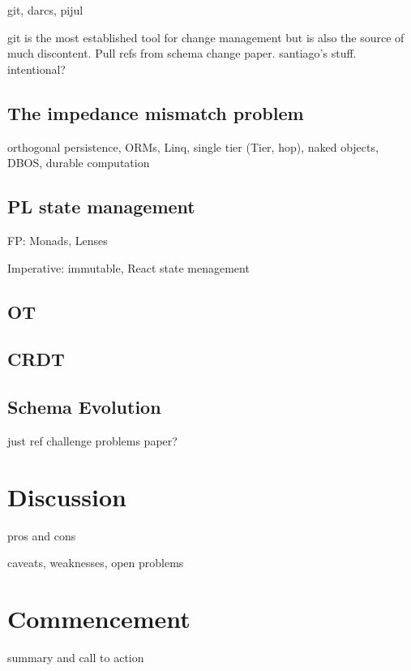 \documentclass[english,submission]{programming}
\theoremstyle{definition}
\begin{document}
git, darcs, pijul

git is the most established tool for change management but is also the source of much discontent. Pull refs from schema change paper. santiago's stuff. intentional?

\subsection{The impedance mismatch problem} \label{impedance}

orthogonal persistence, ORMs, Linq, single tier (Tier, hop), naked objects, DBOS, durable computation

\subsection{PL state management}\label{PLstate}

FP: Monads, Lenses

Imperative: immutable, React state menagement

\subsection{OT}\label{OT}

\subsection{CRDT}\label{CRDT}

\subsection{Schema Evolution}\label{schema}
just ref challenge problems paper?



\section{Discussion}
pros and cons

caveats, weaknesses, open problems

\section{Commencement}
summary and call to action

\printbibliography
\end{document}
